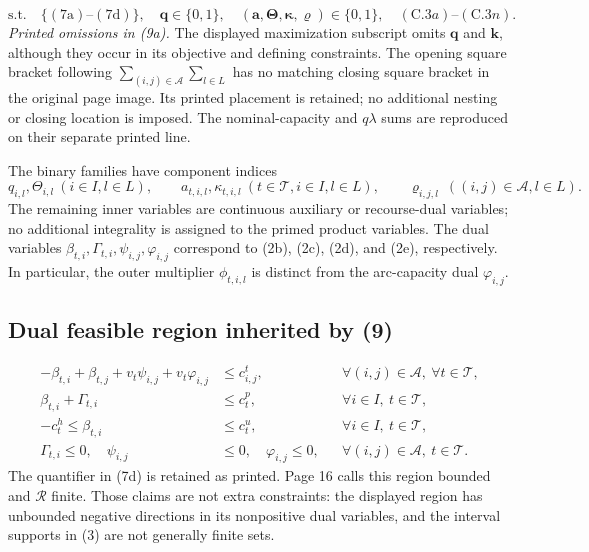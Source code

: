 \documentclass{article}
\begin{document}
\begin{equation}
\text{s.t.}\quad
\{(7\mathrm a)\text{--}(7\mathrm d)\},\quad
\boldsymbol q\in\{0,1\},\quad
(\boldsymbol a,\boldsymbol\Theta,\boldsymbol\kappa,\boldsymbol\varrho)\in\{0,1\},
\quad (\mathrm C.3a)\text{--}(\mathrm C.3n).\tag{9b}
\end{equation}
\noindent\emph{Printed omissions in (9a).} The displayed maximization subscript omits
$\boldsymbol q$ and $\boldsymbol k$, although they occur in its objective and defining
constraints. The opening square bracket following
$\sum_{(i,j)\in\mathcal A}\sum_{l\in L}$ has no matching closing square bracket in the
original page image. Its printed placement is retained; no additional nesting or
closing location is imposed. The nominal-capacity and $q\lambda$ sums are reproduced
on their separate printed line.

The binary families have component indices
\[
q_{i,l},\Theta_{i,l}\ (i\in I,l\in L),\qquad
 a_{t,i,l},\kappa_{t,i,l}\ (t\in\mathcal T,i\in I,l\in L),\qquad
\varrho_{i,j,l}\ ((i,j)\in\mathcal A,l\in L).
\]
The remaining inner variables are continuous auxiliary or recourse-dual variables;
no additional integrality is assigned to the primed product variables.
The dual variables $\beta_{t,i},\Gamma_{t,i},\psi_{i,j},\varphi_{i,j}$ correspond to
(2b), (2c), (2d), and (2e), respectively. In particular, the outer multiplier
$\phi_{t,i,l}$ is distinct from the arc-capacity dual $\varphi_{i,j}$.

\subsection*{Dual feasible region inherited by (9)}
\begin{align}
-\beta_{t,i}+\beta_{t,j}+v_t\psi_{i,j}+v_t\varphi_{i,j}
&\leq c^t_{i,j},
&&\forall(i,j)\in\mathcal A,\ \forall t\in\mathcal T,\tag{7a}\\
\beta_{t,i}+\Gamma_{t,i}&\leq c_t^p,
&&\forall i\in I,\ t\in\mathcal T,\tag{7b}\\
-c_t^h\leq\beta_{t,i}&\leq c_t^u,
&&\forall i\in I,\ t\in\mathcal T,\tag{7c}\\
\Gamma_{t,i}\leq0,\quad\psi_{i,j}&\leq0,\quad\varphi_{i,j}\leq0,
&&\forall(i,j)\in\mathcal A,\ t\in\mathcal T.\tag{7d}
\end{align}
The quantifier in (7d) is retained as printed. Page 16 calls this region bounded and
$\mathcal R$ finite. Those claims are not extra constraints: the displayed region has
unbounded negative directions in its nonpositive dual variables, and the interval
supports in (3) are not generally finite sets.
\end{document}
